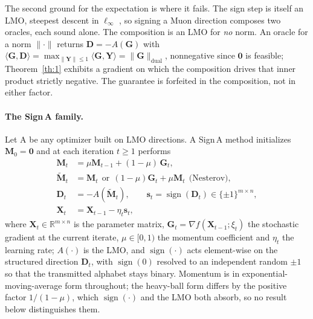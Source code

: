 The second ground for the expectation is where it fails. The sign step is itself an LMO, steepest descent in $\ell_\infty$ \citep{bernstein2024old}, so signing a Muon direction composes two oracles, each sound alone. The composition is an LMO for \emph{no} norm. An oracle for a norm $\|\cdot\|$ returns $\mathbf{D}=-A(\mathbf{G})$ with $\langle\mathbf{G},\mathbf{D}\rangle=\max_{\|\mathbf{Y}\|\le1}\langle\mathbf{G},\mathbf{Y}\rangle=\|\mathbf{G}\|_{\mathrm{dual}}$, nonnegative since $\mathbf{0}$ is feasible; Theorem~\ref{th:1} exhibits a gradient on which the composition drives that inner product strictly negative. The guarantee is forfeited in the composition, not in either factor.

\paragraph{The Sign\,A family.} Let A be any optimizer built on LMO directions. A Sign\,A method initializes $\mathbf{M}_0 = \mathbf{0}$ and at each iteration $t \ge 1$ performs
\begin{equation}
\label{eq:signa_general}
\begin{aligned}
\mathbf{M}_t &= \mu \mathbf{M}_{t-1} + (1-\mu)\,\mathbf{G}_t,\\
\tilde{\mathbf{M}}_t &= \mathbf{M}_t
   \ \ \text{or}\ \ (1-\mu)\mathbf{G}_t + \mu \mathbf{M}_t\ \ \text{(Nesterov)},\\
\mathbf{D}_t &= -A(\tilde{\mathbf{M}}_t),
   \qquad \mathbf{s}_t = \operatorname{sign}(\mathbf{D}_t) \in \{\pm 1\}^{m \times n},\\
\mathbf{X}_{t} &= \mathbf{X}_{t-1} - \eta_t \mathbf{s}_t,
\end{aligned}
\end{equation}
where $\mathbf{X}_t \in \mathbb{R}^{m \times n}$ is the parameter matrix, $\mathbf{G}_t = \nabla f(\mathbf{X}_{t-1};\xi_t)$ the stochastic gradient at the current iterate, $\mu \in [0, 1)$ the momentum coefficient and $\eta_t$ the learning rate; $A(\cdot)$ is the LMO, and $\operatorname{sign}(\cdot)$ acts element-wise on the structured direction $\mathbf{D}_t$, with $\operatorname{sign}(0)$ resolved to an independent random $\pm1$ so that the transmitted alphabet stays binary. Momentum is in exponential-moving-average form throughout; the heavy-ball form differs by the positive factor $1/(1-\mu)$, which $\operatorname{sign}(\cdot)$ and the LMO both absorb, so no result below distinguishes them.

